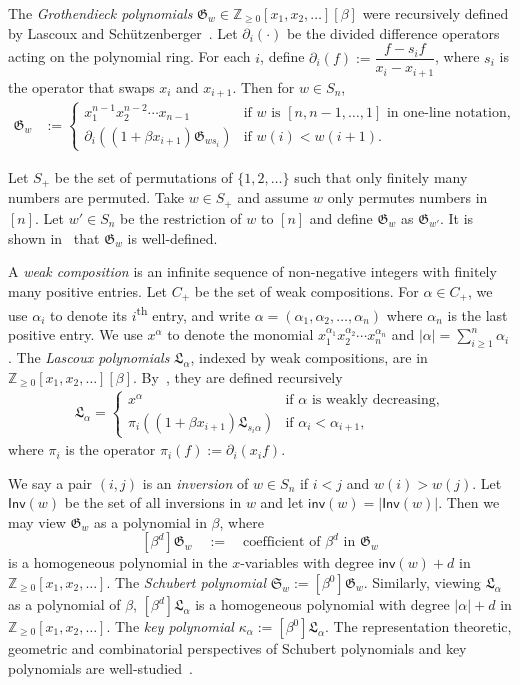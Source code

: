 \documentclass[10pt]{amsart}
\theoremstyle{plain}
\theoremstyle{plain}
\theoremstyle{definition}
\theoremstyle{definition}
\theoremstyle{definition}
\theoremstyle{plain}
\theoremstyle{plain}
\theoremstyle{plain}
\theoremstyle{plain}
\theoremstyle{plain}
\theoremstyle{remark}
\theoremstyle{remark}
\theoremstyle{plain}
\theoremstyle{plain}
\newcommand{\fG}{\mathfrak{G}}
\newcommand{\fGb}{\fG}
\newcommand{\fL}{\mathfrak{L}}
\newcommand{\fLb}{\fL}
\newcommand{\fS}{\mathfrak{S}}
\newcommand{\Z}{\mathbb{Z}}
\newcommand{\Inv}{\mathsf{Inv}}
\newcommand{\inv}{\mathsf{inv}}
\newcommand{\definition}[1]{{\color{darkred}\emph{#1}}}
\begin{document}
The \definition{Grothendieck polynomials} $\fGb_w \in 
\mathbb{Z}_{\geqslant 0}[x_1, x_2, \dots][\beta]$
were recursively defined by Lascoux and Sch{\"u}tzenberger~\cite{LS:Groth}. 
Let $\partial_i(\cdot)$ be the divided difference operators acting 
on the polynomial ring.
For each $i$,
define $\partial_i(f) := \dfrac{f - s_i f}{x_i-x_{i+1}}$,
where $s_i$ is the operator that swaps $x_i$ and $x_{i+1}$.
Then for $w\in S_n$, 
\begin{align*}
\fGb_w &:=
\begin{cases}
x_1^{n-1}x_2^{n-2}\cdots x_{n-1} &\text{if $w$ is $[n, n-1, \dots, 1]$ in one-line notation,} \\
\partial_i( (1 + \beta x_{i+1}) \fGb_{ws_i} ) &\text{if $w(i)<w(i+1)$.}
\end{cases}
\end{align*}

Let $S_+$ be the set of permutations
of $\{1, 2, \dots\}$
such that only finitely many numbers are permuted.
Take $w \in S_+$ and assume $w$ only permutes numbers in $[n]$.
Let $w' \in S_n$ be the restriction of $w$ to $[n]$
and define $\fGb_w$ as $\fGb_{w'}$.
It is shown in~\cite{LS:Groth} that $\fGb_w$ is well-defined.

A \definition{weak composition}
is an infinite sequence of non-negative integers with finitely many positive entries. 
Let $C_+$ be the set of weak compositions. 
For $\alpha \in C_+$, 
we use $\alpha_i$ to denote its $i$\textsuperscript{th} entry,
and write $\alpha = (\alpha_1, \alpha_2, \dots, \alpha_n)$ 
where $\alpha_n$ is the last positive entry. 
We use $x^\alpha$ to denote the monomial
$x_1^{\alpha_1}x_2^{\alpha_2}\cdots x_n^{\alpha_n}$ and
$|\alpha| = \sum_{i\geqslant 1}^n\alpha_i$.
The \definition{Lascoux polynomials} 
$\fLb_\alpha$, indexed by weak compositions,
are in $\mathbb{Z}_{\geqslant 0}[x_1, x_2, \dots][\beta]$. 
By~\cite{Las}, they are defined recursively
\begin{align*}
\fLb_\alpha = \begin{cases}
x^\alpha & \text{if $\alpha$ is weakly decreasing,} \\
\pi_i ((1 + \beta x_{i+1}) \fLb_{s_i\alpha} ) &\text{if $\alpha_i<\alpha_{i+1}$,}
\end{cases}
\end{align*}
where $\pi_i$ is the operator $\pi_i(f) := \partial_i(x_i f)$.


We say a pair $(i,j)$ is an \definition{inversion}
of $w \in S_n$ if $i < j$ and $w(i) > w(j)$. 
Let $\Inv(w)$ be the set of all inversions in $w$
and let $\inv(w) = |\Inv(w)|$.
Then we may view $\fGb_w$ as a polynomial in $\beta$, where
$$
[\beta^d] \fGb_w \quad := \quad \textrm{coefficient of $\beta^d$ in $\fGb_w$}
$$
is a homogeneous polynomial in the $x$-variables with degree 
$\inv(w) + d$ in $\Z_{\geq 0}[x_1,x_2,\dots]$.
The \definition{Schubert polynomial} $\fS_w := [\beta^0]\fGb_w$.
Similarly, viewing $\fLb_\alpha$ as a polynomial of $\beta$,
$[\beta^d] \fLb_\alpha$ is a homogeneous polynomial with degree
$|\alpha| + d$ in $\Z_{\geq 0}[x_1,x_2,\dots]$.
The \definition{key polynomial} $\kappa_\alpha := [\beta^0]\fLb_\alpha$.
The representation theoretic, geometric and combinatorial perspectives of Schubert polynomials and key polynomials
are well-studied~\cite{De,LS1,BJS}.
\end{document}
